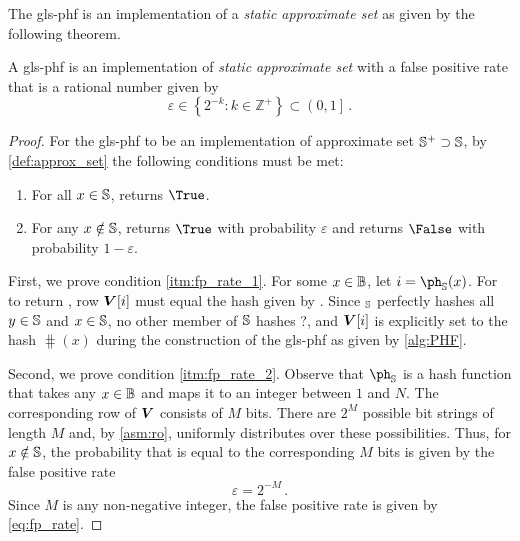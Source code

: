 \documentclass[ ../main.tex]{subfiles}
\begin{document}
The \gls{gls-phf} is an implementation of a \emph{static approximate set} as given by the following theorem.
\begin{theorem}
\label{thm:fp_rate}
A \gls{gls-phf} is an implementation of \emph{static approximate set} with a false positive rate that is a rational number given by
\begin{equation}
\label{eq:fp_rate}
    \varepsilon \in \left\{ 2^{-k} \colon k \in \mathbb{Z}^+\right\} \subset \left(0, 1\right]\,.
\end{equation}
\end{theorem}
\begin{proof}
For the \gls{gls-phf} to be an implementation of approximate set $\mathbb{S}^+ \supset \mathbb{S}$, by \cref{def:approx_set} the following conditions must be met:
\begin{enumerate}
\item\label{itm:fp_rate_1} For all $x \in \mathbb{S}$,  returns $\True$.
\item\label{itm:fp_rate_2} For any $x \notin \mathbb{S}$,  returns $\True$ with probability $\varepsilon$ and returns $\False$ with probability $1 - \varepsilon$.
\end{enumerate}

First, we prove condition \ref{itm:fp_rate_1}. For some $x \in \mathbb{B}$,
let $i = \ph_{\St}(x)$. For  to return \True, row $\boldsymbol{V}[i]$ must equal the hash given by . Since \ph$_{\mathbb{S}}$ perfectly hashes all $y \in \mathbb{S}$ and $x \in \mathbb{S}$, no other member of $\mathbb{S}$ hashes ?, and $\boldsymbol{V}[i]$ is explicitly set to the hash $\hash(x)$ during the construction of the \gls{gls-phf} as given by \cref{alg:PHF}.

Second, we prove condition \ref{itm:fp_rate_2}. Observe that $\ph_{\St}$ is a hash function that takes any $x \in \mathbb{B}$ and maps it to an integer between $1$ and $N$. The corresponding row of $\boldsymbol{V}$ consists of $M$ bits. There are $2^M$ possible bit strings of length $M$ and, by \cref{asm:ro}, \hash uniformly distributes over these possibilities. Thus, for $x \notin \mathbb{S}$, the probability that  is equal to the corresponding $M$ bits is given by the false positive rate
\begin{equation}
\varepsilon = 2^{-M}\,.
\end{equation}
Since $M$ is any non-negative integer, the false positive rate is given by \cref{eq:fp_rate}.
\end{proof}
\end{document}

